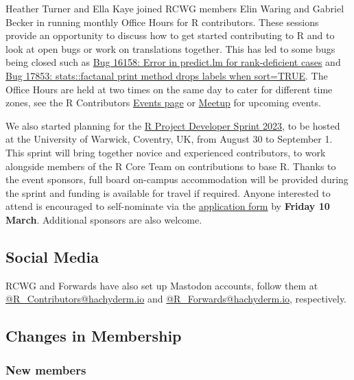 Heather Turner and Ella Kaye joined RCWG members Elin Waring and Gabriel Becker in running monthly Office Hours for R contributors. These sessions provide an opportunity to discuss how to get started contributing to R and to look at open bugs or work on translations together. This has led to some bugs being closed such as \href{https://bugs.r-project.org/show_bug.cgi?id=16158}{Bug 16158: Error in predict.lm for rank-deficient cases} and \href{https://bugs.r-project.org/show_bug.cgi?id=17863}{Bug 17853: stats::factanal print method drops labels when sort=TRUE}. The Office Hours are held at two times on the same day to cater for different time zones, see the R Contributors \href{https://contributor.r-project.org/events/}{Events page} or \href{https://www.meetup.com/r-contributors/}{Meetup} for upcoming events.

We also started planning for the \href{https://contributor.r-project.org/r-project-sprint-2023/}{R Project Developer Sprint 2023}, to be hosted at the University of Warwick, Coventry, UK, from August 30 to September 1. This sprint will bring together novice and experienced contributors, to work alongside members of the R Core Team on contributions to base R. Thanks to the event sponsors, full board on-campus accommodation will be provided during the sprint and funding is available for travel if required. Anyone interested to attend is encouraged to self-nominate via the \href{https://warwick.ac.uk/fac/sci/statistics/news/r-project-sprint-2023}{application form} by \textbf{Friday 10 March}. Additional sponsors are also welcome.

\hypertarget{social-media}{%
\subsection{Social Media}\label{social-media}}

RCWG and Forwards have also set up Mastodon accounts, follow them at \href{https://hachyderm.io/@R_Contributors}{@R\_Contributors@hachyderm.io} and \href{https://hachyderm.io/@R_Forwards}{@R\_Forwards@hachyderm.io}, respectively.

\hypertarget{changes-in-membership}{%
\subsection{Changes in Membership}\label{changes-in-membership}}

\hypertarget{new-members}{%
\subsubsection{New members}\label{new-members}}

